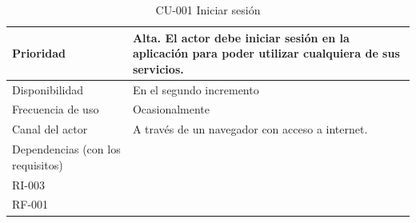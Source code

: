 \begin{table}[htpb]
\begin{tabularx}{\textwidth}{|l|X|}
Prioridad                         & Alta. El actor debe iniciar sesión en la aplicación para poder utilizar cualquiera de sus servicios.                                                                                                                                             \\ \hline
Disponibilidad                    & En el segundo incremento                                                                                                                                                                                                                         \\ \hline
Frecuencia de uso                 & Ocasionalmente                                                                                                                                                                                                                                   \\ \hline
Canal del actor                   & A través de un navegador con acceso a internet.                                                                                                                                                                                                  \\ \hline
Dependencias (con los requisitos) & \begin{tabular}[c]{@{}l@{}}RI-001\\ RI-003\\ RF-001\end{tabular}                                                                                                                                                                                 \\ \hline
\end{tabularx}
\caption{CU-001 Iniciar sesión}
\end{table}


